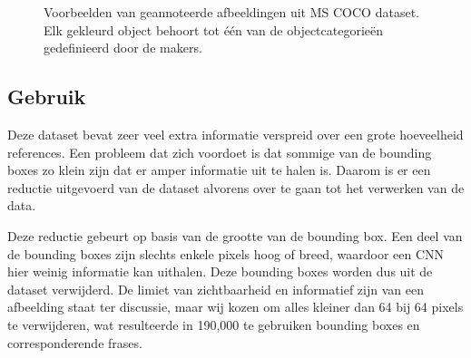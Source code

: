 \begin{figure}
    \centering
    \hfill
    \caption{Voorbeelden van geannoteerde afbeeldingen uit MS COCO dataset. Elk gekleurd object behoort tot \'e\'en van de objectcategorie\"en gedefinieerd door de makers.}
    \label{fig:cocoexamples}
\end{figure}



\subsection{Gebruik}
\label{sub:Gebruik}
Deze dataset bevat zeer veel extra informatie verspreid over een grote hoeveelheid references. Een probleem dat zich voordoet is dat sommige van de bounding boxes zo klein zijn dat er amper informatie uit te halen is. Daarom is er een reductie uitgevoerd van de dataset alvorens over te gaan tot het verwerken van de data. 

Deze reductie gebeurt op basis van de grootte van de bounding box. Een deel van de bounding boxes zijn slechts enkele pixels hoog of breed, waardoor een CNN hier weinig informatie kan uithalen. Deze bounding boxes worden dus uit de dataset verwijderd. De limiet van zichtbaarheid en informatief zijn van een afbeelding staat ter discussie, maar wij kozen om alles kleiner dan 64 bij 64 pixels te verwijderen, wat resulteerde in 190,000 te gebruiken bounding boxes en corresponderende frases. 

